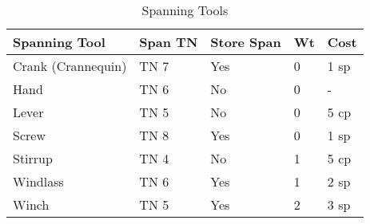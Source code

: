 \documentclass[oneside,11pt,english]{book}
\begin{document}
\begin{table}[ht]
	\centering
	\caption{Spanning Tools}
	\label{tab:Spanning Tools}
	\begin{tabu} spread 0pt {X *{2}{X[-1,c]} *{2}{X[-2,c]}}
		\rowfont[c]{}Spanning Tool & Span TN & Store Span & Wt & Cost \\ \toprule
		Crank (Crannequin)         & TN 7    & Yes        & 0  & 1 sp \\
		Hand                       & TN 6    & No         & 0  & -    \\
		Lever                      & TN 5    & No         & 0  & 5 cp \\
		Screw                      & TN 8    & Yes        & 0  & 1 sp \\
		Stirrup                    & TN 4    & No         & 1  & 5 cp \\
		Windlass                   & TN 6    & Yes        & 1  & 2 sp \\
		Winch                      & TN 5    & Yes        & 2  & 3 sp
	\end{tabu}
\end{table}
\end{document}
